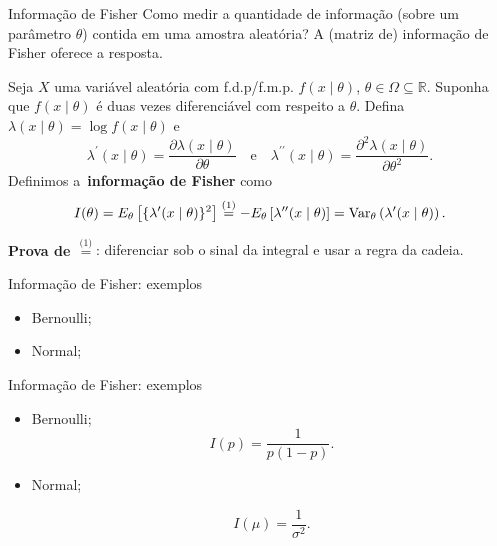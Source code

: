 \begin{frame}{Informação de Fisher}
Como medir a quantidade de informação (sobre um parâmetro $\theta$) contida em uma amostra aleatória?
A (matriz de) informação de Fisher oferece a resposta.
\begin{defn}
 \label{def:Fisher_information}
 Seja $X$ uma variável aleatória com f.d.p/f.m.p. $f(x\mid\theta)$, $\theta \in \Omega \subseteq \mathbb{R}$.
 Suponha que $f(x\mid\theta)$ é duas vezes diferenciável com respeito a $\theta$.
 Defina $\lambda(x\mid \theta) = \log f(x\mid\theta)$ e 
 \begin{equation}
  \lambda^\prime(x\mid \theta) = \frac{\partial \lambda(x\mid \theta)}{\partial \theta}\quad\text{e}\quad \lambda^{\prime\prime}(x\mid \theta) = \frac{\partial^2 \lambda(x\mid \theta)}{\partial \theta^2}.
 \end{equation}
Definimos a~\textbf{informação de Fisher} como
\begin{equation}
 \label{eq:Fisher_information}
 I(\theta) = E_\theta\left[\{\lambda^{\prime}(x\mid \theta)\}^2\right] \stackrel{\text{(1)}}{=} -E_\theta\left[\lambda^{\prime\prime}(x\mid \theta)\right] = \operatorname{Var}_\theta\left(\lambda^{\prime}(x\mid \theta) \right).
\end{equation}
\end{defn}
\textbf{Prova de $\stackrel{\text{(1)}}{=}$}: diferenciar sob o sinal da integral e usar a regra da cadeia.
\end{frame}

\begin{frame}{Informação de Fisher: exemplos}
 \begin{itemize}
  \item Bernoulli;
  \item Normal;
 \end{itemize}

\end{frame}

\begin{frame}{Informação de Fisher: exemplos}
 \begin{itemize}
  \item Bernoulli;
  \begin{equation*}
   I(p) = \frac{1}{p(1-p)}.
  \end{equation*}
  
  \item Normal;
  
  \begin{equation*}
  I(\mu) = \frac{1}{\sigma^2}.
  \end{equation*}
 \end{itemize}

\end{frame}

